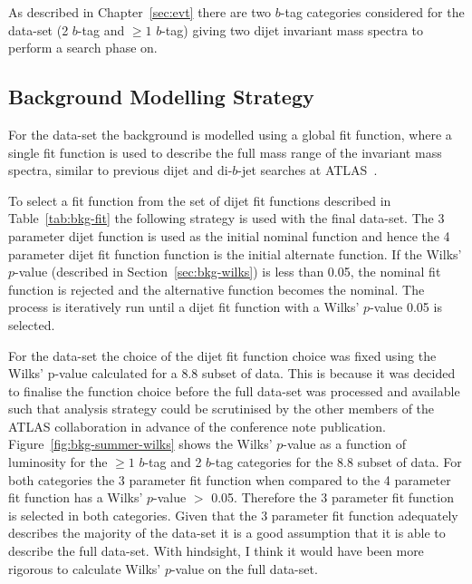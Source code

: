 As described in Chapter~\ref{sec:evt}
there are two $b$-tag categories considered for the \summer{} data-set 
(2 $b$-tag and $\geq1$ $b$-tag)
giving two dijet invariant mass spectra to perform a search phase on.

\subsection{Background Modelling Strategy}
\label{sec:bkg-summer_global}

For the \summer{} data-set the background is modelled using a global fit function,
where a single fit function is used to describe the full mass range of the invariant mass spectra,
similar to previous dijet and di-$b$-jet searches at ATLAS~\cite{dijet-mori16_paper,dibjet-mori16_paper}.

To select a fit function from the set of dijet fit functions described in Table~\ref{tab:bkg-fit} the following strategy is used with the final data-set.
The 3 parameter dijet function is used as the initial nominal function and hence the 4 parameter dijet fit function function is the initial alternate function.
If the Wilks' \mbox{$p$-value} (described in Section~\ref{sec:bkg-wilks}) is less than 0.05, the nominal fit function is rejected and the alternative function becomes the nominal.
The process is iteratively run until a dijet fit function with a Wilks' \mbox{$p$-value} \gt{} 0.05 is selected.

For the \summer{} data-set the choice of the dijet fit function choice was fixed using the Wilks' p-value calculated for a 8.8 \ifb{} subset of data.
This is because it was decided to finalise the function choice before the full data-set was processed and available
such that analysis strategy could be scrutinised by the other members of the ATLAS collaboration in advance of the conference note publication.
Figure~\ref{fig:bkg-summer-wilks} shows the Wilks' \mbox{$p$-value} as a function of luminosity
for the $\geq1$ $b$-tag and 2 $b$-tag categories for the 8.8 \ifb{} subset of data.
For both categories the 3 parameter fit function when compared to the 4 parameter fit function
has a Wilks' \mbox{$p$-value} $>$ 0.05.
Therefore the 3 parameter fit function is selected in both categories.
Given that the 3 parameter fit function adequately describes the majority of the data-set it is a good assumption that it is able to describe the full data-set.
With hindsight, I think it would have been more rigorous to calculate Wilks' \mbox{$p$-value} on the full data-set.

